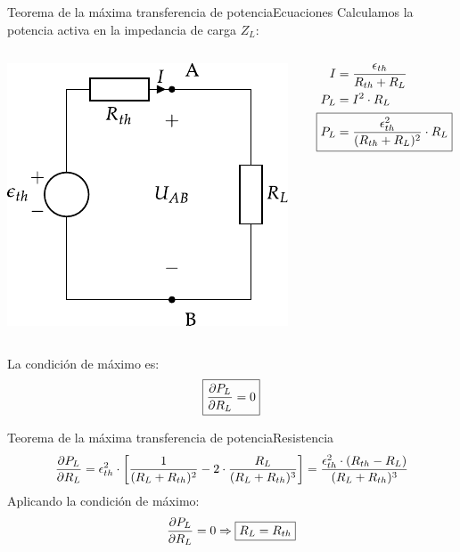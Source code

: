 \documentclass[aspectratio=169, xcolor={usenames,svgnames,dvipsnames}]{beamer}
\begin{document}
\begin{frame}{Teorema de la máxima transferencia de potencia}{Ecuaciones}
Calculamos la potencia activa en la impedancia de carga \(Z_L\):
\begin{columns}
\begin{column}{0.35\columnwidth}
\begin{center}
\includegraphics[height=0.45\textheight]{../figs/thevenin_continua.pdf}
\end{center}
\end{column}


\begin{column}{0.5\columnwidth}
\begin{align*}
{I} &= \frac{{\epsilon}_{th}}{R_{th} + R_L}\\
P_L &= I^2 \cdot R_L\\
\Aboxed{P_L &= \frac{\epsilon^2_{th}}{(R_{th} + R_L)^2} \cdot R_L}
\end{align*}
\end{column}
\end{columns}

La condición de máximo es: 
\[
  \boxed{%
    \diffp{P_L}{R_L} = 0%
  }
\]
\end{frame}

\begin{frame}{Teorema de la máxima transferencia de potencia}{Resistencia}
\begin{equation*}
        \diffp{P_L}{R_L} = \epsilon^2_{th} \cdot \left[\frac{1}{(R_L + R_{th})^2} - 2 \cdot \frac{R_L}{(R_L + R_{th})^3}\right]= \frac{\epsilon^2_{th} \cdot (R_{th} - R_L)}{(R_L + R_{th})^3}
    \end{equation*}
Aplicando la condición de máximo:
\[
   \diffp{P_L}{R_L} = 0 \Rightarrow \boxed{R_L = R_{th}}
\]
\end{frame}
\end{document}
